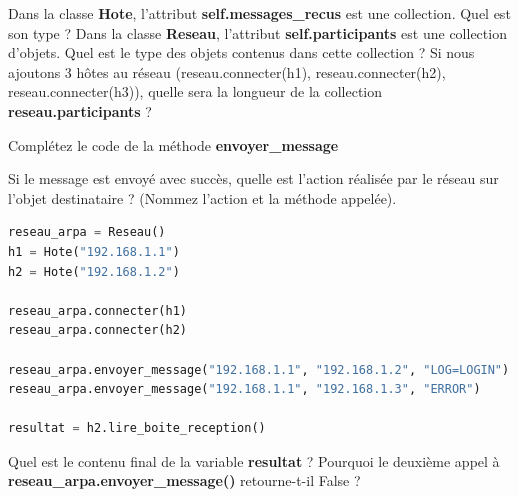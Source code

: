 \begin{Exercise}[title=ARPANET et le Premier Message (1969)]
\Question Dans la classe \textbf{Hote}, l'attribut \textbf{self.messages\_recus} est une collection. Quel est son type ?
\Question Dans la classe \textbf{Reseau}, l'attribut \textbf{self.participants} est une collection d'objets. Quel est le type des objets contenus dans cette collection ?
\Question Si nous ajoutons 3 hôtes au réseau (reseau.connecter(h1), reseau.connecter(h2), reseau.connecter(h3)), quelle sera la longueur de la collection \textbf{reseau.participants} ?

\Question Complétez le code de la méthode \textbf{envoyer\_message} 

\Question Si le message est envoyé avec succès, quelle est l'action réalisée par le réseau sur l'objet destinataire ? (Nommez l'action et la méthode appelée).

\begin{lstlisting}[language=Python]
reseau_arpa = Reseau()
h1 = Hote("192.168.1.1")
h2 = Hote("192.168.1.2")

reseau_arpa.connecter(h1)
reseau_arpa.connecter(h2)

reseau_arpa.envoyer_message("192.168.1.1", "192.168.1.2", "LOG=LOGIN")
reseau_arpa.envoyer_message("192.168.1.1", "192.168.1.3", "ERROR")

resultat = h2.lire_boite_reception()
\end{lstlisting}

\Question Quel est le contenu final de la variable \textbf{resultat} ?
\Question Pourquoi le deuxième appel à \textbf{reseau\_arpa.envoyer\_message()} retourne-t-il False ?
\end{Exercise}

